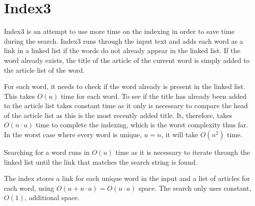 \section{Index3}
\label{section:Index3}

Index3 is an attempt to use more time on the indexing in order to save time during the search. Index3 runs through the input text and adds each word as a link in a linked list if the words do not already appear in the linked list. If the word already exists, the title of the article of the current word is simply added to the article list of the word.

For each word, it needs to check if the word already is present in the linked list. This takes $O(u)$ time for each word. To see if the title has already been added to the article list takes constant time as it only is necessary to compare the head of the article list as this is the most recently added title. It, therefore, takes $O(n\cdot u)$ time to complete the indexing, which is the worst complexity thus far. In the worst case where every word is unique, $u=n$, it will take $O(n^2)$ time. 

Searching for a word runs in $O(u)$ time as it is necessary to iterate through the linked list until the link that matches the search string is found. 

The index stores a link for each unique word in the input and a list of articles for each word, using $O(u + u\cdot a) = O(u\cdot a)$ space. The search only uses constant, $O(1)$, additional space. 
